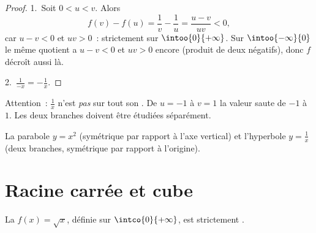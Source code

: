 \begin{proof}
1.~Soit $0 < u < v$. Alors
\[
f(v) - f(u) = \frac1v - \frac1u = \frac{u - v}{uv} < 0,
\]
car $u - v < 0$ et $uv > 0$~: strictement  sur
$\intoo{0}{+\infty}$. Sur $\intoo{-\infty}{0}$ le même quotient a
$u - v < 0$ et $uv > 0$ encore (produit de deux négatifs), donc $f$
décroît aussi là.

2.~$\frac{1}{-x} = -\frac1x$.
\end{proof}

\begin{remark}
Attention~: $\frac1x$ n'est \emph{pas}  sur tout son
. De $u = -1$ à $v = 1$ la valeur saute de $-1$ à
$1$. Les deux branches doivent être étudiées séparément.
\end{remark}

\begin{omfigure}
\hfill
{}

{\small La parabole $y = x^2$ (symétrique par rapport à l'axe vertical)
et l'hyperbole $y = \frac1x$ (deux branches, symétrique par rapport à
l'origine).}
\end{omfigure}

\section{Racine carrée et cube}

\begin{proposition}\label{prop:g10:reffunc:sqrt}
La  $f(x) = \sqrt{x}$, définie sur $\intco{0}{+\infty}$, est
strictement .
\end{proposition}

